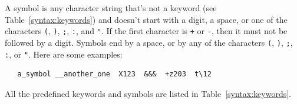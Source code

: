 \documentclass[11pt,twoside,fleqn,openright,titlepage]{cslreport}
\begin{document}
A  symbol  is   any  character  string  that's  not   a  keyword  (see
Table~\ref{syntax:keywords}) and doesn't start  with a digit, a space,
or   one  of  the   characters  \texttt{(},   \texttt{)},  \texttt{;},
\texttt{:}, and  \texttt{"}. If the  first character is  \texttt{+} or
\texttt{-}, then it must not be  followed by a digit. Symbols end by a
space, or by any of the characters \texttt{(}, \texttt{)}, \texttt{;},
\texttt{:}, or \texttt{"}. Here are some examples:
\begin{small}
\begin{verbatim}
   a_symbol __another_one  X123  &&&  +z203  t\12
\end{verbatim}
\end{small}
All   the   predefined   keywords    and   symbols   are   listed   in
Table~\ref{syntax:keywords}.
\end{document}
